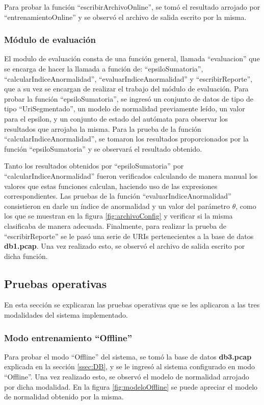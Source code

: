 Para probar la función ``escribirArchivoOnline'', se tomó el resultado arrojado por ``entrenamientoOnline'' y se observó el archivo de salida escrito por la misma.
\subsubsection{Módulo de evaluación}

El modulo de evaluación consta de una función general, llamada ``evaluacion'' que se encarga de hacer la llamada a función de: ``epsiloSumatoria'',
``calcularIndiceAnormalidad'', ``evaluarIndiceAnormalidad'' y ``escribirReporte'', que a su vez se encargan de realizar el trabajo del módulo de evaluación.
Para probar la función ``epsiloSumatoria'', se ingresó un conjunto de datos de tipo de tipo ``UriSegmentado'', un modelo de normalidad previamente leído, un valor para el epsilon, y un conjunto de estado del autómata para observar los resultados que arrojaba la misma.
Para la prueba de la función ``calcularIndiceAnormalidad'', se tomaron
los resultados proporcionados por la función ``epsiloSumatoria'' y se observará el resultado obtenido.

Tanto los resultados obtenidos por ``epsiloSumatoria'' por ``calcularIndiceAnormalidad'' fueron verificados calculando de manera manual los valores
que estas funciones calculan, haciendo uso de las expresiones correspondientes.
Las pruebas de la función ``evaluarIndiceAnormalidad'' consistieron en
darle un  índice de anormalidad y un valor del parámetro $\theta$, como los que
se muestran en la figura \ref{fig:archivoConfig} y verificar si la misma clasificaba de manera adecuada.
Finalmente, para realizar la prueba de ``escribirReporte'' se le pasó una serie de URIs pertenecientes a la base de datos \textbf{db1.pcap}. Una vez realizado
esto, se observó el archivo de salida escrito por dicha función.

\subsection{Pruebas operativas}

En esta sección se explicaran las pruebas operativas que se les aplicaron
a las tres modalidades del sistema implementado.

\subsubsection{Modo entrenamiento ``Offline''}

Para probar el modo ``Offline'' del sistema, se tomó la base de datos \textbf{db3.pcap} explicada en la sección \ref{ssec:DB}, y se le ingresó al sistema configurado en modo ``Offline''. Una vez realizado esto, se observó el modelo de
normalidad arrojado por dicha modalidad.
En la figura \ref{fig:modeloOffline} se puede apreciar el modelo de normalidad obtenido
por la misma.

